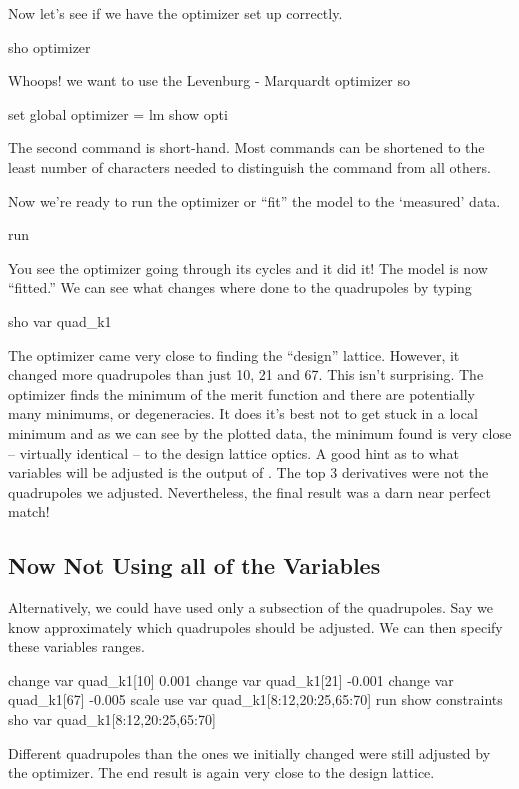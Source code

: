 Now let's see if we have the optimizer set up correctly.
\begin{example}
  sho optimizer
\end{example}
Whoops! we want to use the Levenburg - Marquardt optimizer so
\begin{example}
  set global optimizer = lm
  show opti
\end{example}
The second command is short-hand. Most \tao commands can be shortened
to the least number of characters needed to distinguish the command
from all others.

Now we're ready to run the optimizer or ``fit'' the model to the
`measured' data.
\begin{example}
  run
\end{example}
You see the optimizer going through its cycles and it did it! The
model is now ``fitted.'' We can see what changes where done to the
quadrupoles by typing
\begin{example}
  sho var quad\_k1
\end{example}
The optimizer came very close to finding the ``design''
lattice. However, it changed more quadrupoles than just 10, 21 and
67. This isn't surprising. The optimizer finds the minimum of the
merit function and there are potentially many minimums, or
degeneracies.  It does it's best not to get stuck in a local minimum
and as we can see by the plotted data, the minimum found is very close
-- virtually identical -- to the design lattice optics.  A good hint
as to what variables will be adjusted is the output of .  The top 3 derivatives were not the quadrupoles we
adjusted. Nevertheless, the final result was a darn near perfect
match!

\subsection{Now Not Using all of the Variables}
\label{ss:fix_it_not_all}

Alternatively, we could have used only a subsection of the
quadrupoles. Say we know approximately which quadrupoles should be
adjusted. We can then specify these variables ranges.
\begin{example}
  change var quad\_k1[10]   0.001
  change var quad\_k1[21]  -0.001
  change var quad\_k1[67]  -0.005
  scale
  use var quad\_k1[8:12,20:25,65:70]
  run
  show constraints
  sho var quad\_k1[8:12,20:25,65:70]
\end{example}
Different quadrupoles than the ones we initially changed were still
adjusted by the optimizer. The end result is again very close to the
design lattice.

